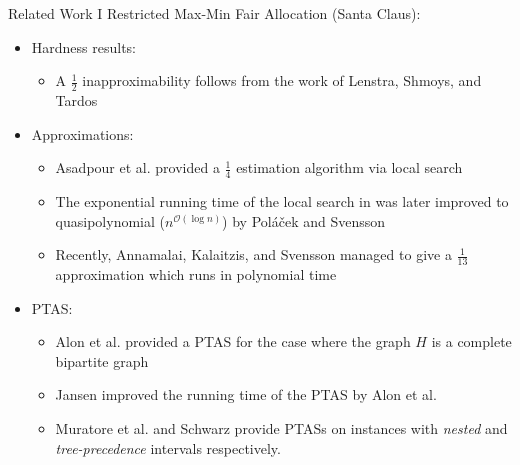 \documentclass[10pt]{beamer}
\begin{document}
\begin{frame}{Related Work I}
	Restricted Max-Min Fair Allocation (Santa Claus):
	\begin{itemize}
		\item<2-> Hardness results:
        \begin{itemize}
        	\item<3-> A $\frac{1}{2}$ inapproximability follows from the work of Lenstra, Shmoys, and Tardos \cite{LST90} 
		\end{itemize}
        \item<4-> Approximations:
        \begin{itemize}
            \item<5-> Asadpour et al. provided a $\frac{1}{4}$ \alert{estimation} algorithm via local search \cite{AFS08}
            \item<6-> The exponential running time of the local search in \cite{AFS08} was later improved to quasipolynomial ($n^{\mathcal{O}(\log n)}$) by Pol\'{a}\v{c}ek and Svensson \cite{PS12}
            \item<7-> Recently, Annamalai, Kalaitzis, and Svensson managed to give a \alert{$\frac{1}{13}$} approximation which runs in polynomial time \cite{AKS14}
        \end{itemize}
        \item<8-> PTAS:
        \begin{itemize}
            \item<9-> Alon et al. provided a PTAS for the case where the graph $H$ is a complete bipartite graph \cite{AAWY98}
            \item<10-> Jansen improved the running time of the PTAS by Alon et al. \cite{Jansen10}
            \item<11-> Muratore et al. \cite{MSW10} and Schwarz \cite{Schwarz10} provide PTASs on instances with \emph{nested} and \emph{tree-precedence} intervals respectively.
        \end{itemize}
	\end{itemize}
\end{frame}
\end{document}
